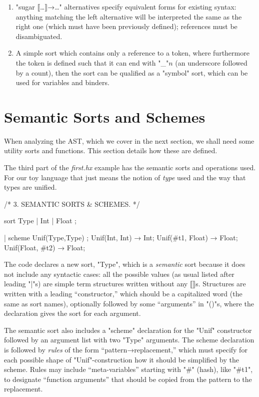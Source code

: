 \documentclass[11pt]{article} %
\begin{document}
\begin{manual}
\begin{enumerate}
  \item "sugar ⟦…⟧→…" alternatives specify equivalent forms for existing syntax: anything matching
    the left alternative will be interpreted the same as the right one (which must have been
    previously defined); references must be disambiguated.

  \item A simple sort which contains only a reference to a token, where furthermore the token is
    defined such that it can end with "_"$n$ (an underscore followed by a count), then the sort can
    be qualified as a "symbol" sort, which can be used for variables and binders.

  \end{enumerate}
\end{manual}


\section{Semantic Sorts and Schemes}
\label{sec:schemes}

When analyzing the AST, which we cover in the next section, we shall need some utility sorts and
functions. This section details how these are defined.

\begin{example}\label{ex:types}
  The third part of the \emph{first.hx} example has the semantic sorts and operations used. For our
  toy language that just means the notion of \emph{type} used and the way that types are unified.
\begin{code}[xleftmargin=1.66em,numbers=left]
/* 3. SEMANTIC SORTS & SCHEMES. */

sort Type | Int | Float ;

| scheme Unif(Type,Type) ;
Unif(Int, Int) → Int;
Unif(#t1, Float) → Float;
Unif(Float, #t2) → Float;
\end{code}
  The code declares a new sort, "Type", which is a \emph{semantic} sort because it does not include
  any syntactic cases: all the possible values (as usual listed after leading "|"s) are simple term
  structures written without any ⟦⟧s.  Structures are written with a leading ``constructor,'' which
  should be a capitalized word (the same as sort names), optionally followed by some ``arguments''
  in "()"s, where the declaration gives the sort for each argument.

  The semantic sort also includes a "scheme" declaration for the "Unif" constructor followed by an
  argument list with two "Type" arguments. The scheme declaration is followed by \emph{rules} of the
  form ``pattern→replacement,'' which must specify for each possible shape of "Unif"-construction
  how it should be simplified by the scheme.  Rules may include ``meta-variables'' starting with "#"
  (hash), like "#t1", to designate ``function arguments'' that should be copied from the pattern to
  the replacement.
\end{example}
\end{document}
